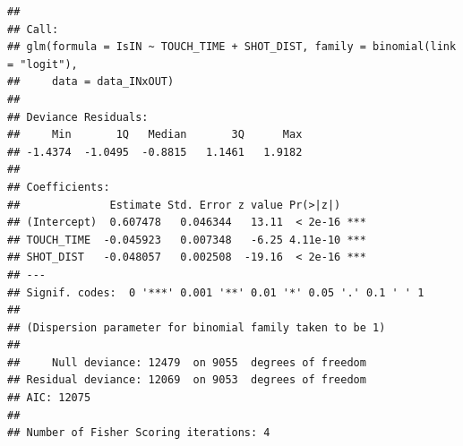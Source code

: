 \documentclass[
  11pt,
]{article}
\begin{document}
\begin{verbatim}
## 
## Call:
## glm(formula = IsIN ~ TOUCH_TIME + SHOT_DIST, family = binomial(link = "logit"), 
##     data = data_INxOUT)
## 
## Deviance Residuals: 
##     Min       1Q   Median       3Q      Max  
## -1.4374  -1.0495  -0.8815   1.1461   1.9182  
## 
## Coefficients:
##              Estimate Std. Error z value Pr(>|z|)    
## (Intercept)  0.607478   0.046344   13.11  < 2e-16 ***
## TOUCH_TIME  -0.045923   0.007348   -6.25 4.11e-10 ***
## SHOT_DIST   -0.048057   0.002508  -19.16  < 2e-16 ***
## ---
## Signif. codes:  0 '***' 0.001 '**' 0.01 '*' 0.05 '.' 0.1 ' ' 1
## 
## (Dispersion parameter for binomial family taken to be 1)
## 
##     Null deviance: 12479  on 9055  degrees of freedom
## Residual deviance: 12069  on 9053  degrees of freedom
## AIC: 12075
## 
## Number of Fisher Scoring iterations: 4
\end{verbatim}

  
\end{document}
